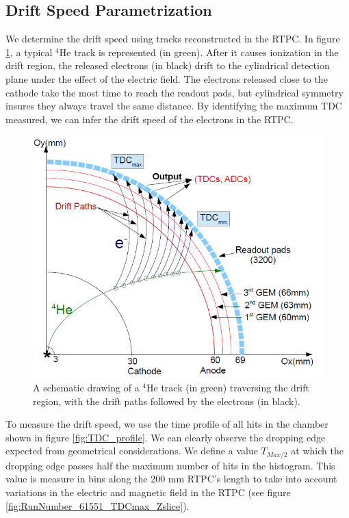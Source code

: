 \documentclass[twocolumn,showpacs,superscriptaddress,groupedaddress]{revtex4}
\begin{document}
\subsection{Drift Speed Parametrization}

We determine the drift speed using tracks reconstructed in the RTPC. In figure 
\ref{fig:RTPC_signals}, a typical $^{4}$He track is represented (in green). After 
it causes ionization in the drift region, the released electrons (in black) 
drift to the cylindrical detection plane under the effect of the electric field. The 
electrons released close to the cathode take the most time to reach the readout 
pads, but cylindrical symmetry insures they always travel the same 
distance. By identifying the maximum TDC measured, we can infer the drift 
speed of the electrons in the RTPC.\\

\begin{figure}[tb]
\centering
\includegraphics[scale=0.35]{fig/RTPC_2.png}
\caption[]{A schematic drawing of a $^{4}$He track (in green) traversing the 
drift region, with the drift paths followed by the electrons (in black). } 
\label{fig:RTPC_signals}
\end{figure}

To measure the drift speed, we use the time profile of all hits in the 
chamber shown in figure \ref{fig:TDC_profile}. We can clearly observe the 
dropping edge expected from geometrical considerations. We define a value $T_{Max/2}$ at 
which the dropping edge passes half the maximum number of hits in the 
histogram. This value is measure in bins along the 200 mm RTPC's length to take into 
account variations in the electric and magnetic field in the RTPC (see figure 
\ref{fig:RunNumber_61551_TDCmax_Zslice}). 
\end{document}
